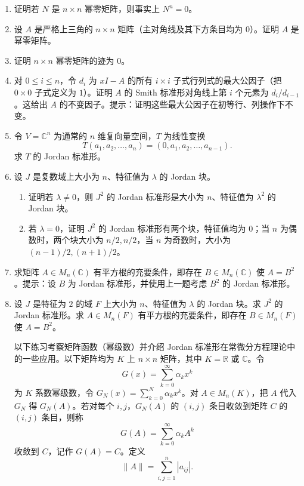 \begin{enumerate}[label=\arabic*.]
\item 证明若 $N$ 是 $n\times n$ 幂零矩阵，则事实上 $N^n=0$。

\item 设 $A$ 是严格上三角的 $n\times n$ 矩阵（主对角线及其下方条目均为 $0$）。证明 $A$ 是幂零矩阵。

\item 证明 $n\times n$ 幂零矩阵的迹为 $0$。

\item 对 $0\leq i\leq n$，令 $d_i$ 为 $xI-A$ 的所有 $i\times i$ 子式行列式的最大公因子（把 $0\times0$ 子式定义为 $1$）。证明 $A$ 的 Smith 标准形对角线上第 $i$ 个元素为 $d_i/d_{i-1}$。这给出 $A$ 的不变因子。提示：证明这些最大公因子在初等行、列操作下不变。

\item 令 $V=\mathbb C^n$ 为通常的 $n$ 维复向量空间，$T$ 为线性变换
\[
T(a_1,a_2,
\ldots,a_n)=(0,a_1,a_2,
\ldots,a_{n-1}).
\]
求 $T$ 的 Jordan 标准形。

\item 设 $J$ 是复数域上大小为 $n$、特征值为 $\lambda$ 的 Jordan 块。
\begin{enumerate}[label=(\alph*)]
\item 证明若 $\lambda\ne0$，则 $J^2$ 的 Jordan 标准形是大小为 $n$、特征值为 $\lambda^2$ 的 Jordan 块。
\item 若 $\lambda=0$，证明 $J^2$ 的 Jordan 标准形有两个块，特征值均为 $0$；当 $n$ 为偶数时，两个块大小为 $n/2,n/2$，当 $n$ 为奇数时，大小为 $(n-1)/2,(n+1)/2$。
\end{enumerate}

\item 求矩阵 $A\in M_n(\mathbb C)$ 有平方根的充要条件，即存在 $B\in M_n(\mathbb C)$ 使 $A=B^2$。提示：设 $B$ 为 Jordan 标准形，并使用上一题考虑 $B^2$ 的 Jordan 标准形。

\item 设 $J$ 是特征为 $2$ 的域 $F$ 上大小为 $n$、特征值为 $\lambda$ 的 Jordan 块。求 $J^2$ 的 Jordan 标准形。求 $A\in M_n(F)$ 有平方根的充要条件，即存在 $B\in M_n(F)$ 使 $A=B^2$。

\medskip
以下练习考察矩阵函数（幂级数）并介绍 Jordan 标准形在常微分方程理论中的一些应用。以下矩阵均为 $K$ 上 $n\times n$ 矩阵，其中 $K=\mathbb R$ 或 $\mathbb C$。令
\[
G(x)=\sum_{k=0}^{\infty}\alpha_kx^k
\]
为 $K$ 系数幂级数，令 $G_N(x)=\sum_{k=0}^N\alpha_kx^k$。对 $A\in M_n(K)$，把 $A$ 代入 $G_N$ 得 $G_N(A)$。若对每个 $i,j$，$G_N(A)$ 的 $(i,j)$ 条目收敛到矩阵 $C$ 的 $(i,j)$ 条目，则称
\[
G(A)=\sum_{k=0}^{\infty}\alpha_kA^k
\]
收敛到 $C$，记作 $G(A)=C$。定义
\[
\|A\|=\sum_{i,j=1}^n |a_{ij}|.
\]


\end{enumerate}
